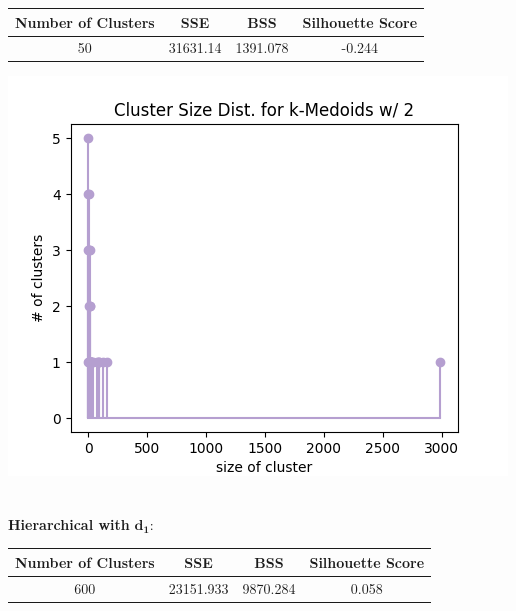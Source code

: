 \documentclass[fleqn]{article}
\begin{document}
\begin{minipage}{0.65\textwidth}
    \begin{tabular}{|c|c|c|c|}
        \hline
        \textbf{Number of Clusters} & \textbf{SSE} &\textbf{BSS} &\textbf{Silhouette Score}\\
        \hline
        50 & 31631.14 & 1391.078 & -0.244\\
        \hline
    \end{tabular}
\end{minipage}\begin{minipage}{0.35\textwidth}
    \includegraphics[scale=0.35]{images/size_dist_km_d2.png}
\end{minipage}\\
\textbf{Hierarchical with }$\mathbf{d_1}$:\\
\begin{minipage}{0.65\textwidth}
\begin{tabular}{|c|c|c|c|}
    \hline
    \textbf{Number of Clusters} & \textbf{SSE} &\textbf{BSS} &\textbf{Silhouette Score}\\
    \hline
    600 & 23151.933 & 9870.284 & 0.058\\
    \hline
\end{tabular}
\end{minipage}
\end{document}
